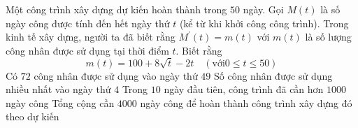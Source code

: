 \begin{ex}%
	Một công trình xây dựng dự kiến hoàn thành trong $50$ ngày. Gọi $M(t)$ là số ngày công được tính đến hết ngày thứ $t$ (kể từ khi khởi công công trình). Trong kinh tế xây dựng, người ta đã biết rằng $M^{\prime}(t)=m(t)$ với $m(t)$ là số lượng công nhân được sử dụng tại thời điểm $t$. Biết rằng
	$$
	m(t)=100+8\sqrt{t}-2t \quad(\text{với} 0 \leq t \leq 50)
	$$
	\choiceTF
	{ Có $72$ công nhân được sử dụng vào ngày thứ $49$}
	{\True Số công nhân được sử dụng nhiều nhất vào ngày thứ $4$}
	{\True Trong $10$ ngày đầu tiên, công trình đã cần hơn $1000$ ngày công}
	{Tổng cộng cần $4000$ ngày công để hoàn thành công trình xây dựng đó theo dự kiến}
\end{ex}

